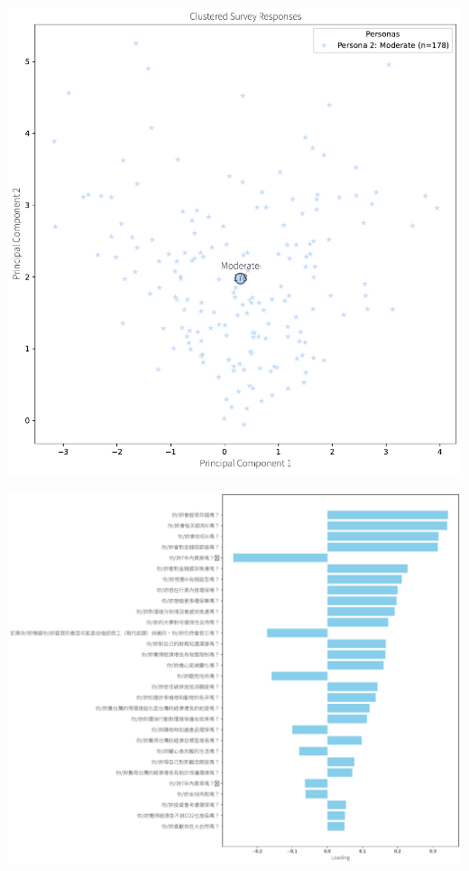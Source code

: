 \documentclass[
  letterpaper,
  DIV=11,
  numbers=noendperiod]{scrartcl}
\begin{document}
\includegraphics{_thesis_files/figure-pdf/cell-80-output-1.pdf}

\includegraphics{_thesis_files/figure-pdf/cell-80-output-2.pdf}
\end{document}
